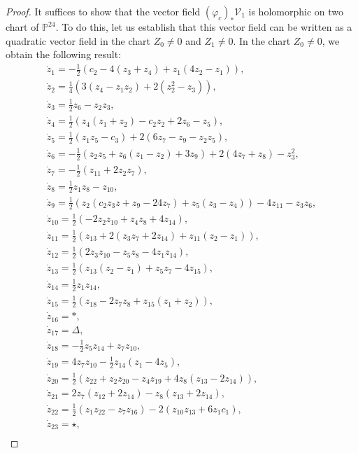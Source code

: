 \documentclass[pdftex]{sigma}
\numberwithin{equation}{section}
\begin{document}
\begin{proof}
It suffices to show that the vector field
$(\varphi_c)_{\ast}\mathcal{V}_1$ is holomorphic on two
chart of $\mathbb{P}^{24}$. To do this, let us establish that this
vector field can be written as a quadratic vector field in the chart
$Z_0\neq0$ and $Z_1\neq0$. In the chart $Z_0\neq0$, we obtain the
following result:
\begin{gather*}
 \dot{z}_1= -\frac{1}{2}(c_2-4(z_3+z_4)+z_1(4z_2-z_1)) ,\\
 \dot{z}_2= \frac{1}{4}(3(z_4-z_1z_2)+2(z_2^2-z_3)) ,\\
 \dot{z}_3= \frac{1}{2}z_6-z_2z_3 ,\\
 \dot{z}_4= \frac{1}{2}(z_4(z_1+z_2)-c_2z_2+2z_6-z_5) ,\\
 \dot{z}_5= \frac{1}{2}(z_1z_5-c_3)+2(6z_7-z_9-z_2z_5) ,\\
 \dot{z}_6= -\frac{1}{2}(z_2z_5+z_6(z_1-z_2)+3z_9)+2(4z_7+z_8)-z_3^2 ,\\
 \dot{z}_7= -\frac{1}{2}(z_{11}+2z_2z_7) ,\\
 \dot{z}_8= \frac{1}{2}z_1z_8-z_{10} ,\\
 \dot{z}_9= \frac{1}{2}(z_2(c_2z_3z+z_9-24z_7)+z_5(z_3-z_4))-4z_{11}-z_3z_6 ,\\
 \dot{z}_{10}= \frac{1}{2}(-2z_2z_{10}+z_4z_8+4z_{14}) ,\\
 \dot{z}_{11}= \frac{1}{2}(z_{13}+2(z_3z_7+2z_{14})+z_{11}(z_2-z_1)) ,\\
 \dot{z}_{12}= \frac{1}{2}(2z_3z_{10}-z_5z_8-4z_1z_{14}) ,\\
 \dot{z}_{13}= \frac{1}{2}(z_{13}(z_2-z_1)+z_5z_7-4z_{15}) ,\\
 \dot{z}_{14}= \frac{1}{2}z_1z_{14} ,\\
 \dot{z}_{15}= \frac{1}{2}(z_{18}-2z_7z_8+z_{15}(z_1+z_2)),\\
 \dot{z}_{16}= \ast,\\
 \dot{z}_{17}= \Delta,\\
 \dot{z}_{18}= -\frac{1}{2}z_5z_{14}+z_7z_{10},\\
 \dot{z}_{19}= 4z_7z_{10}-\frac{1}{2}z_{14}(z_1-4z_5) ,\\
 \dot{z}_{20}= \frac{1}{2}(z_{22}+z_2z_{20}-z_4z_{19}+4z_8(z_{13}-2z_{14})),\\
 \dot{z}_{21}= 2z_7(z_{12}+2z_{14})-z_8(z_{13}+2z_{14}),\\
 \dot{z}_{22}= \frac{1}{2}(z_1z_{22}-z_7z_{16})-2(z_{10}z_{13}+6z_1c_1) ,\\
 \dot{z}_{23}= \star ,\\

\end{gather*}
\end{proof}
\end{document}
